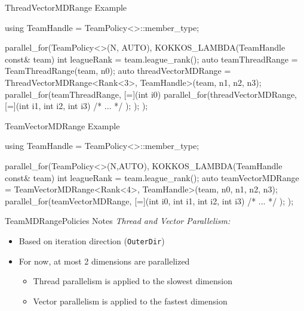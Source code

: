 
\begin{frame}[fragile]{ThreadVectorMDRange Example}

\begin{code}[keywords={ThreadVectorMDRange}]
using TeamHandle = TeamPolicy<>::member_type;

parallel_for(TeamPolicy<>(N, AUTO),
             KOKKOS_LAMBDA(TeamHandle const& team) { 
  int leagueRank = team.league_rank(); 
  auto teamThreadRange = TeamThreadRange(team, n0);
  auto threadVectorMDRange = ThreadVectorMDRange<Rank<3>,
                             TeamHandle>(team, n1, n2, n3);
  parallel_for(teamThreadRange, [=](int i0) {
    parallel_for(threadVectorMDRange,
      [=](int i1, int i2, int i3) {
        /* ... */
    });
  });
}); 
\end{code}

\end{frame}


\begin{frame}[fragile]{TeamVectorMDRange Example}

\begin{code}[keywords={TeamVectorMDRange}]
using TeamHandle = TeamPolicy<>::member_type;

parallel_for(TeamPolicy<>(N,AUTO),
             KOKKOS_LAMBDA(TeamHandle const& team) {
  int leagueRank = team.league_rank();
  auto teamVectorMDRange = TeamVectorMDRange<Rank<4>,
                           TeamHandle>(team, n0, n1, n2, n3);
  parallel_for(teamVectorMDRange,
    [=](int i0, int i1, int i2, int i3) {
      /* ... */
  });
}); 
\end{code}

\end{frame}


\begin{frame}[fragile]{TeamMDRangePolicies Notes}
\textit{Thread and Vector Parallelism:}

\begin{itemize}
  \item Based on iteration direction (\texttt{OuterDir})
  \item For now, at most 2 dimensions are parallelized
  \begin{itemize}
    \item Thread parallelism is applied to the slowest dimension
    \item Vector parallelism is applied to the fastest dimension
  \end{itemize}
\end{itemize}

\end{frame}



